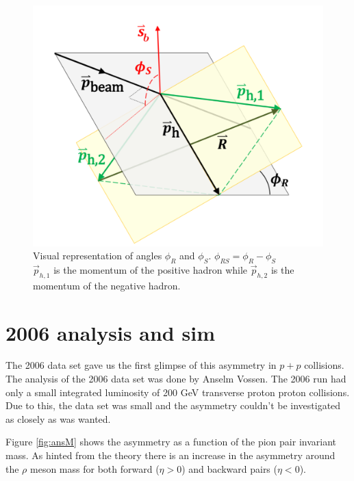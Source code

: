 \documentclass[abstract = on,listof=totoc, bibliography=totoc]{scrreprt}
\newcommand{\phir}{\phi_{R}}
\newcommand{\phis}{\phi_{S}}
\begin{document}
\begin{figure}
\begin{center}
\includegraphics[width = 1\textwidth]{IFF_frame_edit2}
\caption[Angles $\phis$ and $\phir$]{Visual representation of angles $\phi_R$ and $\phi_S$. $\phi_{RS} = \phi_R - \phi_S$ \\ $\vec{p}_{h,1}$ is the momentum of the positive hadron while  $\vec{p}_{h,2}$ is the momentum of the negative hadron.}
\label{fig:angleDeff}
\end{center}
\end{figure}




\chapter{2006 analysis and sim}
\label{chap:2006}

The 2006 data set gave us the first glimpse of this asymmetry in $p+p$ collisions. The analysis of the 2006 data set was done by Anselm Vossen. The 2006 run had only a small integrated luminosity of 200 GeV transverse proton proton collisions. Due to this, the data set was small and the asymmetry couldn't be investigated as closely as was wanted. 


Figure \ref{fig:ansM} shows the asymmetry as a function of the pion pair invariant mass. As hinted from the theory there is an increase in the asymmetry around the $\rho$ meson mass for both forward ($\eta > 0$) and backward pairs ($\eta < 0$). 
\end{document}
